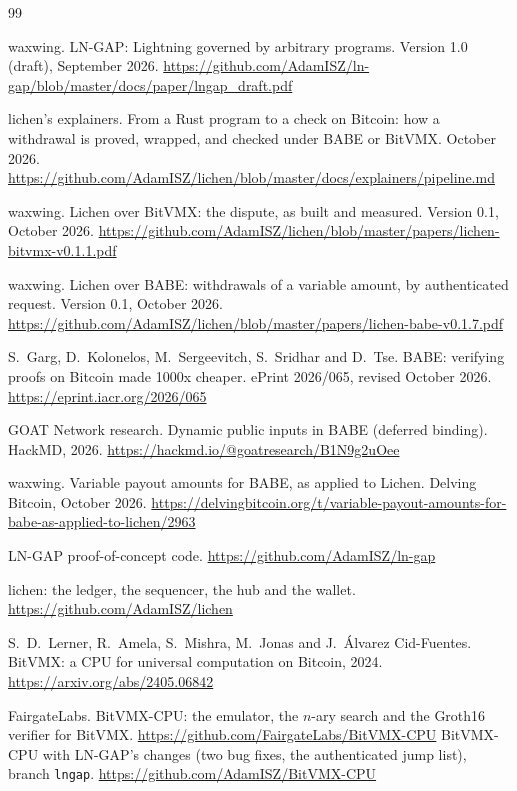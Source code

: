 \documentclass[11pt]{article}
\begin{document}
\begin{thebibliography}{99}

 waxwing. LN-GAP: Lightning governed by arbitrary programs. Version 1.0 (draft), September 2026. \url{https://github.com/AdamISZ/ln-gap/blob/master/docs/paper/lngap_draft.pdf}

 lichen's explainers. From a Rust program to a check on Bitcoin: how a withdrawal is proved, wrapped, and checked under BABE or BitVMX. October 2026. \url{https://github.com/AdamISZ/lichen/blob/master/docs/explainers/pipeline.md}

 waxwing. Lichen over BitVMX: the dispute, as built and measured. Version 0.1, October 2026. \url{https://github.com/AdamISZ/lichen/blob/master/papers/lichen-bitvmx-v0.1.1.pdf}

 waxwing. Lichen over BABE: withdrawals of a variable amount, by authenticated request. Version 0.1, October 2026. \url{https://github.com/AdamISZ/lichen/blob/master/papers/lichen-babe-v0.1.7.pdf}

 S.~Garg, D.~Kolonelos, M.~Sergeevitch, S.~Sridhar and D.~Tse. BABE: verifying proofs on Bitcoin made 1000x cheaper. ePrint 2026/065, revised October 2026. \url{https://eprint.iacr.org/2026/065}

 GOAT Network research. Dynamic public inputs in BABE (deferred binding). HackMD, 2026. \url{https://hackmd.io/@goatresearch/B1N9g2uOee}

 waxwing. Variable payout amounts for BABE, as applied to Lichen. Delving Bitcoin, October 2026. \url{https://delvingbitcoin.org/t/variable-payout-amounts-for-babe-as-applied-to-lichen/2963}

 LN-GAP proof-of-concept code. \url{https://github.com/AdamISZ/ln-gap}

 lichen: the ledger, the sequencer, the hub and the wallet. \url{https://github.com/AdamISZ/lichen}

 S.~D.~Lerner, R.~Amela, S.~Mishra, M.~Jonas and J.~\'Alvarez Cid-Fuentes. BitVMX: a CPU for universal computation on Bitcoin, 2024. \url{https://arxiv.org/abs/2405.06842}

 FairgateLabs. BitVMX-CPU: the emulator, the $n$-ary search and the Groth16 verifier for BitVMX. \url{https://github.com/FairgateLabs/BitVMX-CPU}
 BitVMX-CPU with LN-GAP's changes (two bug fixes, the authenticated jump list), branch \texttt{lngap}. \url{https://github.com/AdamISZ/BitVMX-CPU}


\end{thebibliography}
\end{document}
